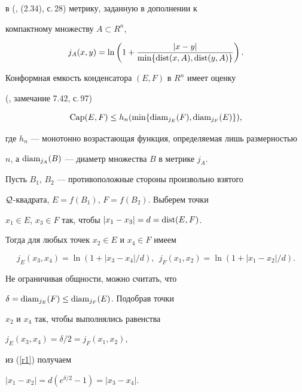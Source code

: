 \begin{pf}
в (\cite{Vu}, (2.34), с.\,28) метрику, заданную в дополнении к 


компактному множеству $A\subset R^n$,


$$


j_A(x,y) = \ln\left( 1 + \frac{|x-y|}{ \min \{\dist(x,A), \dist 


(y,A) \} } \right). 


$$


Конформная емкость конденсатора $(E,F)$ в $R^n$ имеет оценку 


(\cite{Vu}, замечание 7.42, с.\,97)


\begin{equation}


\label{r2}


\Capp(E,F) \leq h_n( \min \{ 


\diam_{j_E}(F), \diam_{j_F}(E) \} ),


\end{equation}


где $h_n$ --- монотонно возрастающая функция, определяемая лишь размерностью 


$n$, а $\operatorname{diam}_{j_A}(B)$ --- диаметр множества $B$ в метрике $j_A$. 


Пусть $B_1$, $B_2$ --- противоположные стороны произвольно взятого 


${\cal Q}$-квадрата, $E=f(B_1)$, $F=f(B_2)$. Выберем точки 


$x_1 \in E$, $x_3 \in F$ так, чтобы $|x_1 - x_3|= d = \operatorname{dist}(E,F)$. 


Тогда для любых точек $x_2 \in E$ и $x_4\in F$ имеем 


\begin{equation}


\label{r1}


j_E (x_3, x_4) = \ln(1 + |x_3 - x_4|/d),\ \


j_F (x_1, x_2) = \ln(1 + |x_1 - x_2|/d). 


\end{equation}


Не ограничивая общности, можно считать, что 


$\delta = \operatorname{diam}_{j_E}(F) \leq \operatorname{diam}_{j_F}(E)$. Подобрав точки 


$x_2$ и $x_4$ так, чтобы выполнялись равенства 


$j_E(x_3, x_4) = \delta /2 = j_F(x_1, x_2)$,


из (\ref{r1}) получаем


$|x_1 - x_2| = d( e^{\delta/2} -1) = |x_3 - x_4|$.



\end{pf}
